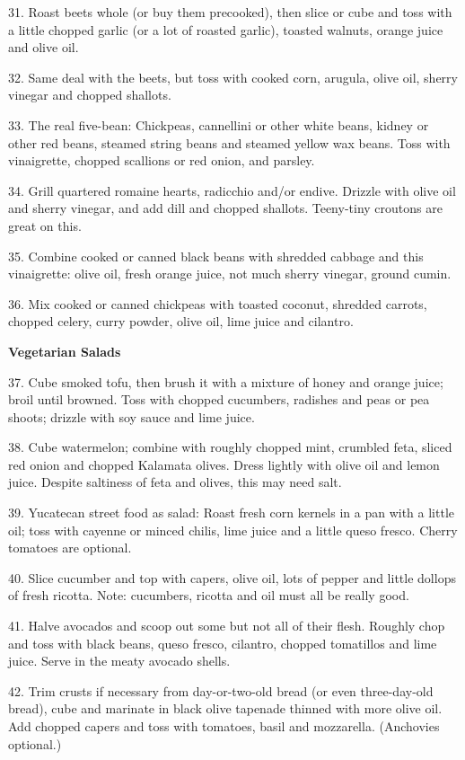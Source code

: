 \begin{recipe}
31. Roast beets whole (or buy them precooked), then slice or cube and
toss with a little chopped garlic (or a lot of roasted garlic),
toasted walnuts, orange juice and olive oil.

32. Same deal with the beets, but toss with cooked corn, arugula,
olive oil, sherry vinegar and chopped shallots.

33. The real five-bean: Chickpeas, cannellini or other white beans,
kidney or other red beans, steamed string beans and steamed yellow wax
beans. Toss with vinaigrette, chopped scallions or red onion, and
parsley.

34. Grill quartered romaine hearts, radicchio and/or endive. Drizzle
with olive oil and sherry vinegar, and add dill and chopped
shallots. Teeny-tiny croutons are great on this.

35. Combine cooked or canned black beans with shredded cabbage and
this vinaigrette: olive oil, fresh orange juice, not much sherry
vinegar, ground cumin.

36. Mix cooked or canned chickpeas with toasted coconut, shredded
carrots, chopped celery, curry powder, olive oil, lime juice and
cilantro.

\textbf{Vegetarian Salads}

37. Cube smoked tofu, then brush it with a mixture of honey and orange
juice; broil until browned. Toss with chopped cucumbers, radishes and
peas or pea shoots; drizzle with soy sauce and lime juice.

38. Cube watermelon; combine with roughly chopped mint, crumbled feta,
sliced red onion and chopped Kalamata olives. Dress lightly with olive
oil and lemon juice. Despite saltiness of feta and olives, this may
need salt.

39. Yucatecan street food as salad: Roast fresh corn kernels in a pan
with a little oil; toss with cayenne or minced chilis, lime juice and
a little queso fresco. Cherry tomatoes are optional.

40. Slice cucumber and top with capers, olive oil, lots of pepper and
little dollops of fresh ricotta. Note: cucumbers, ricotta and oil must
all be really good.

41. Halve avocados and scoop out some but not all of their
flesh. Roughly chop and toss with black beans, queso fresco, cilantro,
chopped tomatillos and lime juice. Serve in the meaty avocado shells.

42. Trim crusts if necessary from day-or-two-old bread (or even
three-day-old bread), cube and marinate in black olive tapenade
thinned with more olive oil. Add chopped capers and toss with
tomatoes, basil and mozzarella. (Anchovies optional.)


\end{recipe}
